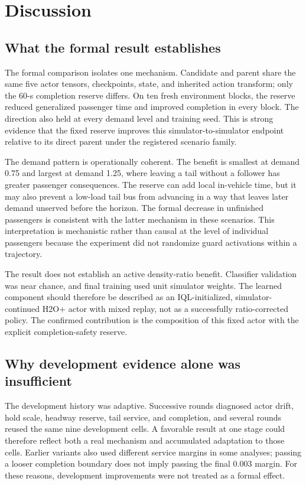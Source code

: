 \section{Discussion}
\label{sec:discussion}

\subsection{What the formal result establishes}

The formal comparison isolates one mechanism. Candidate and parent share the
same five actor tensors, checkpoints, state, and inherited action transform;
only the 60-s completion reserve differs. On ten fresh environment blocks, the
reserve reduced generalized passenger time and improved completion in every
block. The direction also held at every demand level and training seed. This is
strong evidence that the fixed reserve improves this simulator-to-simulator
endpoint relative to its direct parent under the registered scenario family.

The demand pattern is operationally coherent. The benefit is smallest at
demand 0.75 and largest at demand 1.25, where leaving a tail without a follower
has greater passenger consequences. The reserve can add local in-vehicle time,
but it may also prevent a low-load tail bus from advancing in a way that leaves
later demand unserved before the horizon. The formal decrease in unfinished
passengers is consistent with the latter mechanism in these scenarios.
This interpretation is mechanistic rather than causal at the level of
individual passengers because the experiment did not randomize guard
activations within a trajectory.

The result does not establish an active density-ratio benefit. Classifier
validation was near chance, and final training used unit simulator weights.
The learned component should therefore be described as an IQL-initialized,
simulator-continued H2O+ actor with mixed replay, not as a successfully
ratio-corrected policy. The confirmed contribution is the composition of this
fixed actor with the explicit completion-safety reserve.

\subsection{Why development evidence alone was insufficient}

The development history was adaptive. Successive rounds diagnosed actor drift,
hold scale, headway reserve, tail service, and completion, and several rounds
reused the same nine development cells. A favorable result at one stage could
therefore reflect both a real mechanism and accumulated adaptation to those
cells. Earlier variants also used different service margins in some analyses;
passing a looser completion boundary does not imply passing the final 0.003
margin. For these reasons, development improvements were not treated as a
formal effect.

